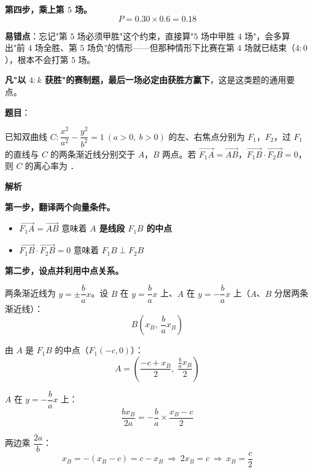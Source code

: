 \begin{answer}
\textbf{第四步，乘上第 $5$ 场。}
\nopagebreak[4]
\[P=0.30\times0.6=0.18\]

\begin{gktip}
\textbf{易错点}：忘记"第 $5$ 场必须甲胜"这个约束，直接算"$5$ 场中甲胜 $4$ 场"，会多算出"前 $4$ 场全胜、第 $5$ 场负"的情形——但那种情形下比赛在第 $4$ 场就已结束（$4:0$），根本不会打第 $5$ 场。

\textbf{凡"以 $4:k$ 获胜"的赛制题，最后一场必定由获胜方赢下}，这是这类题的通用要点。
\end{gktip}


\par\medskip

\end{answer}
\begin{answer}

\textbf{题目}：

已知双曲线 $C:\dfrac{x^{2}}{a^{2}}-\dfrac{y^{2}}{b^{2}}=1\ (a>0,\ b>0)$ 的左、右焦点分别为 $F_1$，$F_2$，过 $F_1$ 的直线与 $C$ 的两条渐近线分别交于 $A$，$B$ 两点。若 $\overrightarrow{F_1A}=\overrightarrow{AB}$，$\overrightarrow{F_1B}\cdot\overrightarrow{F_2B}=0$，则 $C$ 的离心率为 \gkblank{}．

\textbf{解析}

\textbf{第一步，翻译两个向量条件。}

\begin{itemize}
\item $\overrightarrow{F_1A}=\overrightarrow{AB}$ 意味着 \textbf{$A$ 是线段 $F_1B$ 的中点}
\item $\overrightarrow{F_1B}\cdot\overrightarrow{F_2B}=0$ 意味着 \textbf{$F_1B\perp F_2B$}
\end{itemize}

\textbf{第二步，设点并利用中点关系。}

两条渐近线为 $y=\pm\dfrac ba x$。设 $B$ 在 $y=\dfrac ba x$ 上、$A$ 在 $y=-\dfrac ba x$ 上（$A$、$B$ 分居两条渐近线）：
\nopagebreak[4]
\[B\left(x_B,\ \frac ba x_B\right)\]

由 $A$ 是 $F_1B$ 的中点（$F_1(-c,0)$）：
\nopagebreak[4]
\[A=\left(\frac{-c+x_B}2,\ \frac{\frac ba x_B}2\right)\]

$A$ 在 $y=-\dfrac ba x$ 上：
\nopagebreak[4]
\[\frac{b x_B}{2a}=-\frac ba\times\frac{x_B-c}2\]

两边乘 $\dfrac{2a}b$：
\nopagebreak[4]
\[x_B=-(x_B-c)=c-x_B\ \Longrightarrow\ 2x_B=c\ \Longrightarrow\ x_B=\frac c2\]


\end{answer}
